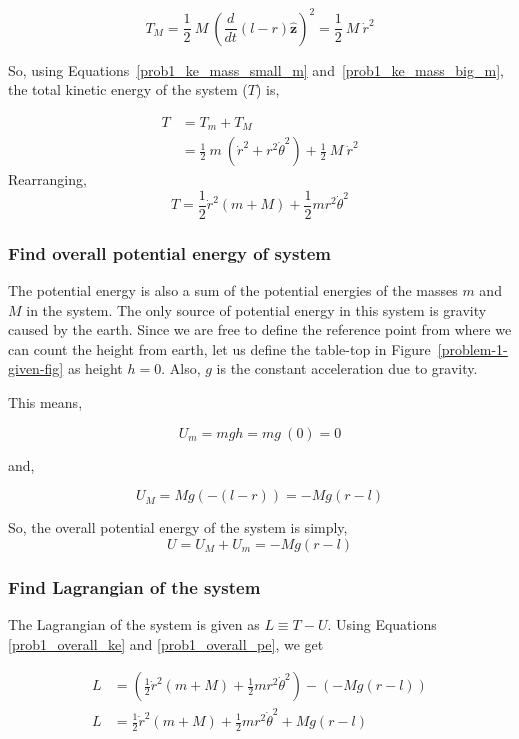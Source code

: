\documentclass[conference]{IEEEtran}
\begin{document}
\begin{equation} \label{prob1_ke_mass_big_m}    
    T_M = \frac{1}{2}~M~\left(\frac{d}{dt}(l-r)\hat{\textbf{z}}\right)^2 = \frac{1}{2}~M~\dot{r}^2
\end{equation}

So, using Equations~\ref{prob1_ke_mass_small_m} and~\ref{prob1_ke_mass_big_m},
the total kinetic energy of the system ($T$) is,

\begin{align*}
    T &= T_m + T_M\\
      &=\frac{1}{2}~m~(\dot{r}^2 + r^2\dot{\theta}^2) + \frac{1}{2}~M~\dot{r}^2
\end{align*}
Rearranging,
\begin{equation} \label{prob1_overall_ke}
    T = \frac{1}{2} \dot{r}^2 (m + M) + \frac{1}{2} m r^2 \dot{\theta}^2
\end{equation}

\subsubsection{Find overall potential energy of system}
The potential energy is also a sum of the potential energies of the masses
$m$ and $M$ in the system. The only source of potential energy in
this system is gravity caused by the earth. Since we are free to define
the reference point from where we can count the height from earth, let us
define the table-top in Figure~\ref{problem-1-given-fig} as height $h = 0$.
Also, $g$ is the constant acceleration due to gravity.

This means,

\[
    U_m = mgh = mg~(0) = 0
\]

and,

\[
    U_M = Mg(-(l-r)) = -Mg(r-l)
\]

So, the overall potential energy of the system is simply,
\begin{equation} \label{prob1_overall_pe}
    U = U_M + U_m = -Mg(r-l)
\end{equation}

\subsubsection{Find Lagrangian of the system}
The Lagrangian of the system is given as $L \equiv T - U$. Using Equations 
\ref{prob1_overall_ke} and \ref{prob1_overall_pe}, we get

\begin{align*}
    L &= \left(\frac{1}{2} \dot{r}^2 (m + M) + 
        \frac{1}{2} m r^2 \dot{\theta}^2\right) -
        (-Mg(r-l))\\
    L &= \frac{1}{2} \dot{r}^2 (m + M) + 
    \frac{1}{2} m r^2 \dot{\theta}^2 + Mg(r-l)
\end{align*}
\end{document}
